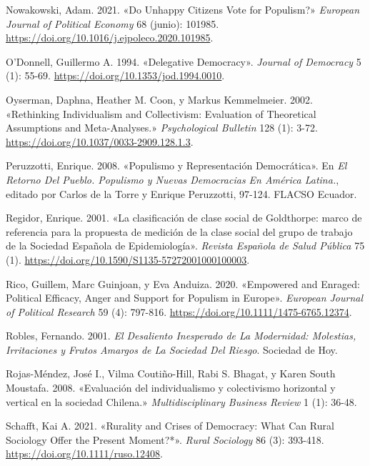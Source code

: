 \documentclass[
  letterpaper,
  DIV=11,
  numbers=noendperiod]{scrartcl}
\newlength{\cslhangindent}
\newenvironment{CSLReferences}[2] %
 {\begin{list}{}{%
  \setlength{\itemindent}{0pt}
  \setlength{\leftmargin}{0pt}
  \setlength{\parsep}{0pt}
  \ifodd #1
   \setlength{\leftmargin}{\cslhangindent}
   \setlength{\itemindent}{-1\cslhangindent}
  \fi
  \setlength{\itemsep}{#2\baselineskip}}}
 {\end{list}}
\begin{document}
\begin{CSLReferences}{1}{0}
Nowakowski, Adam. 2021. {«Do Unhappy Citizens Vote for Populism?»}
\emph{European Journal of Political Economy} 68 (junio): 101985.
\url{https://doi.org/10.1016/j.ejpoleco.2020.101985}.

O'Donnell, Guillermo A. 1994. {«Delegative {Democracy}»}. \emph{Journal
of Democracy} 5 (1): 55-69. \url{https://doi.org/10.1353/jod.1994.0010}.

Oyserman, Daphna, Heather M. Coon, y Markus Kemmelmeier. 2002.
{«Rethinking Individualism and Collectivism: {Evaluation} of Theoretical
Assumptions and Meta-Analyses.»} \emph{Psychological Bulletin} 128 (1):
3-72. \url{https://doi.org/10.1037/0033-2909.128.1.3}.

Peruzzotti, Enrique. 2008. {«Populismo y Representaci{ó}n
Democr{á}tica»}. En \emph{El Retorno Del Pueblo. {Populismo} y Nuevas
Democracias En {Am{é}rica Latina}.}, editado por Carlos de la Torre y
Enrique Peruzzotti, 97-124. FLACSO Ecuador.

Regidor, Enrique. 2001. {«{La clasificaci{ó}n de clase social de
Goldthorpe: marco de referencia para la propuesta de medici{ó}n de la
clase social del grupo de trabajo de la Sociedad Espa{ñ}ola de
Epidemiolog{í}a}»}. \emph{Revista Espa{ñ}ola de Salud P{ú}blica} 75 (1).
\url{https://doi.org/10.1590/S1135-57272001000100003}.

Rico, Guillem, Marc Guinjoan, y Eva Anduiza. 2020. {«Empowered and
Enraged: {Political} Efficacy, Anger and Support for Populism in
{Europe}»}. \emph{European Journal of Political Research} 59 (4):
797-816. \url{https://doi.org/10.1111/1475-6765.12374}.

Robles, Fernando. 2001. \emph{El Desaliento Inesperado de La Modernidad:
Molestias, Irritaciones y Frutos Amargos de La Sociedad Del Riesgo}.
Sociedad de Hoy.

Rojas-Méndez, José I., Vilma Coutiño-Hill, Rabi S. Bhagat, y Karen South
Moustafa. 2008. {«{Evaluaci{ó}n del individualismo y colectivismo
horizontal y vertical en la sociedad Chilena.}»} \emph{Multidisciplinary
Business Review} 1 (1): 36-48.

Schafft, Kai A. 2021. {«Rurality and {Crises} of {Democracy}: {What Can
Rural Sociology Offer} the {Present Moment}?*»}. \emph{Rural Sociology}
86 (3): 393-418. \url{https://doi.org/10.1111/ruso.12408}.


\end{CSLReferences}
\end{document}
